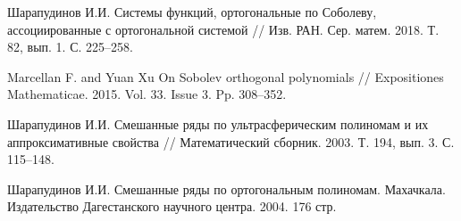 \documentclass{article}
\numberwithin{equation}{section}
\theoremstyle{plain}
\theoremstyle{definition}
\begin{document}
\begin{thebibliography}{20}
Шарапудинов И.И. Системы функций, ортогональные по Соболеву, ассоциированные с ортогональной системой // Изв. РАН. Сер. матем. 2018. Т. 82, вып. 1. С. 225--258.


Marcellan F. and Yuan Xu On Sobolev orthogonal polynomials // Expositiones Mathematicae. 2015. Vol. 33. Issue 3. Pp. 308--352.


Шарапудинов И.И. Смешанные ряды по ультрасферическим полиномам и их аппроксимативные свойства // Математический сборник. 2003. Т. 194, вып. 3. С. 115--148.


Шарапудинов И.И. Смешанные ряды по ортогональным полиномам. Махачкала. Издательство Дагестанского научного центра. 2004. 176 стр.


\end{thebibliography}
\end{document}
